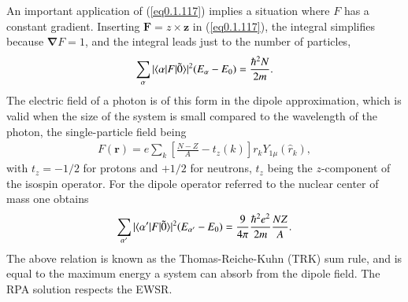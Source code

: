 An important application of (\ref{eq0.1.117}) implies a situation where $F$ has a constant gradient. Inserting $\mathbf F=z\times\mathbf z$ in (\ref{eq0.1.117}), the integral simplifies because $\pmb \nabla F=1$, and the integral leads just to the number of particles,
\begin{align}\label{eq0.1.118}
\sum_{\alpha}|\langle {\alpha|F|\tilde 0} \rangle|^2(E_{\alpha}-E_0)=\frac{\hbar^2N}{2m}.
\end{align}
The electric field of a photon is of this form in the dipole approximation, which is valid when the size of the system is small compared to the wavelength of the photon, the single-particle field being
\begin{align}\label{eq0.1.119}
F(\mathbf r)=e\sum_{k}\left[\frac{N-Z}{A}-t_z(k)\right]r_kY_{1\mu}(\hat r_k),
\end{align}
with $t_z=-1/2$ for protons and $+1/2$ for neutrons, $t_z$ being the $z$-component of the isospin operator. For the dipole operator referred to the nuclear center of mass one obtains
\begin{align}\label{eq0.1.120}
\sum_{\alpha'}|\langle {\alpha'|F|\tilde 0} \rangle|^2(E_{\alpha'}-E_0)=\frac{9}{4\pi}\frac{\hbar^2e^2}{2m}\frac{NZ}{A}.
\end{align}
 The above relation is known as the Thomas-Reiche-Kuhn (TRK) sum rule, and is equal to the maximum energy a system can absorb from the dipole field. The RPA solution respects the EWSR. 
